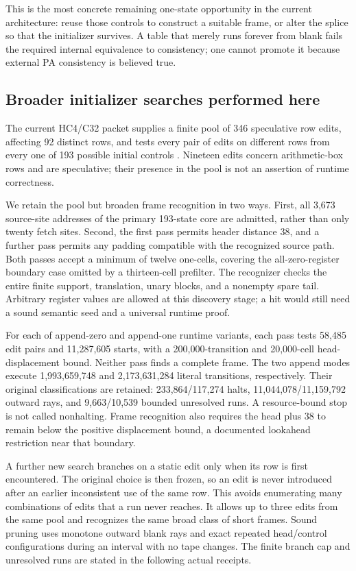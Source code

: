 \documentclass[11pt,a4paper]{article}
\begin{document}
This is the most concrete remaining one-state opportunity in the current
architecture: reuse those controls to construct a suitable frame, or alter
the splice so that the initializer survives. A table that merely runs
forever from blank fails the required internal equivalence to consistency;
one cannot promote it because external PA consistency is believed true.

\subsection{Broader initializer searches performed here}
The current HC4/C32 packet supplies a finite pool of 346 speculative row
edits, affecting 92 distinct rows, and tests every pair of edits on
different rows from every one of 193 possible initial controls
\cite{hc4}. Nineteen edits concern arithmetic-box rows and are speculative;
their presence in the pool is not an assertion of runtime correctness.

We retain the pool but broaden frame recognition in two ways. First, all
3,673 source-site addresses of the primary 193-state core are admitted,
rather than only twenty fetch sites. Second, the first pass permits header
distance 38, and a further pass permits any padding compatible with the
recognized source path. Both passes accept a minimum of twelve one-cells,
covering the all-zero-register boundary case omitted by a thirteen-cell
prefilter. The recognizer checks the entire finite support, translation,
unary blocks, and a nonempty spare tail. Arbitrary register values are
allowed at this discovery stage; a hit would still need a sound semantic
seed and a universal runtime proof.

For each of append-zero and append-one runtime variants, each pass tests
58,485 edit pairs and 11,287,605 starts, with a 200,000-transition and
20,000-cell head-displacement bound. Neither pass finds a complete frame.
The two append modes execute 1,993,659,748 and 2,173,631,284 literal
transitions, respectively. Their original classifications are retained:
233,864/117,274 halts, 11,044,078/11,159,792 outward rays, and
9,663/10,539 bounded unresolved runs. A resource-bound stop is not called
nonhalting. Frame recognition also requires the head plus 38 to remain below the positive displacement bound, a documented lookahead restriction near that boundary.

A further new search branches on a static edit only when its row is first
encountered. The original choice is then frozen, so an edit is never
introduced after an earlier inconsistent use of the same row. This avoids
enumerating many combinations of edits that a run never reaches. It
allows up to three edits from the same pool and recognizes the same broad
class of short frames. Sound pruning uses monotone outward blank rays and
exact repeated head/control configurations during an interval with no
tape changes. The finite branch cap and unresolved runs are stated in the
following actual receipts.

\end{document}
